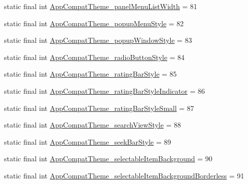 \begin{DoxyCompactItemize}
\item 
static final int \mbox{\hyperlink{classandroid_1_1support_1_1v7_1_1appcompat_1_1R_1_1styleable_acce98a5594dacb0b3e2e8b2996f57115}{App\+Compat\+Theme\+\_\+panel\+Menu\+List\+Width}} = 81
\item 
static final int \mbox{\hyperlink{classandroid_1_1support_1_1v7_1_1appcompat_1_1R_1_1styleable_a634a0a1274878447854f76fbc6d73ff6}{App\+Compat\+Theme\+\_\+popup\+Menu\+Style}} = 82
\item 
static final int \mbox{\hyperlink{classandroid_1_1support_1_1v7_1_1appcompat_1_1R_1_1styleable_a7d67d8207d0b95f7bafa0bee88901c2b}{App\+Compat\+Theme\+\_\+popup\+Window\+Style}} = 83
\item 
static final int \mbox{\hyperlink{classandroid_1_1support_1_1v7_1_1appcompat_1_1R_1_1styleable_a507b0da84c2a4c3cc7f348ce92b93afa}{App\+Compat\+Theme\+\_\+radio\+Button\+Style}} = 84
\item 
static final int \mbox{\hyperlink{classandroid_1_1support_1_1v7_1_1appcompat_1_1R_1_1styleable_af2fdf6d4685eaf6d4e89e2158bdb3e3b}{App\+Compat\+Theme\+\_\+rating\+Bar\+Style}} = 85
\item 
static final int \mbox{\hyperlink{classandroid_1_1support_1_1v7_1_1appcompat_1_1R_1_1styleable_a1f2336445a8f0e6b541206745dfd6e70}{App\+Compat\+Theme\+\_\+rating\+Bar\+Style\+Indicator}} = 86
\item 
static final int \mbox{\hyperlink{classandroid_1_1support_1_1v7_1_1appcompat_1_1R_1_1styleable_a276cc020d5ff419b84b2ff5d85ab6b92}{App\+Compat\+Theme\+\_\+rating\+Bar\+Style\+Small}} = 87
\item 
static final int \mbox{\hyperlink{classandroid_1_1support_1_1v7_1_1appcompat_1_1R_1_1styleable_a4f714859a4d201db6fc8c8bf78cc4669}{App\+Compat\+Theme\+\_\+search\+View\+Style}} = 88
\item 
static final int \mbox{\hyperlink{classandroid_1_1support_1_1v7_1_1appcompat_1_1R_1_1styleable_a16545da0fa5e65d1e4f16e861ae18103}{App\+Compat\+Theme\+\_\+seek\+Bar\+Style}} = 89
\item 
static final int \mbox{\hyperlink{classandroid_1_1support_1_1v7_1_1appcompat_1_1R_1_1styleable_acabe4330c965c183ae0187d8a0e1e6ca}{App\+Compat\+Theme\+\_\+selectable\+Item\+Background}} = 90
\item 
static final int \mbox{\hyperlink{classandroid_1_1support_1_1v7_1_1appcompat_1_1R_1_1styleable_ac11572c84c328c4715eb1b8b1f549b6a}{App\+Compat\+Theme\+\_\+selectable\+Item\+Background\+Borderless}} = 91
\item 

\end{DoxyCompactItemize}
